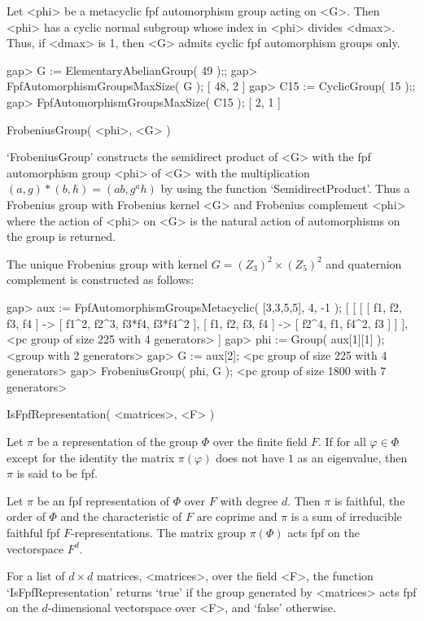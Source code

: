 Let <phi> be a metacyclic fpf automorphism group acting on <G>.
Then <phi> has a cyclic normal subgroup whose index in <phi> divides <dmax>.
Thus, if <dmax> is 1, then <G> admits cyclic fpf automorphism
groups only.

\beginexample
    gap> G := ElementaryAbelianGroup( 49 );;
    gap> FpfAutomorphismGroupsMaxSize( G );
    [ 48, 2 ]
    gap> C15 := CyclicGroup( 15 );;
    gap> FpfAutomorphismGroupsMaxSize( C15 );
    [ 2, 1 ]
\endexample

\>FrobeniusGroup( <phi>, <G> )

`FrobeniusGroup' constructs the semidirect product of <G> with the 
fpf automorphism group <phi> of <G> with the multiplication
$(a,g)*(b,h)=(ab,g^ah)$ by using the function `SemidirectProduct'.
Thus a Frobenius group with Frobenius kernel <G> and Frobenius complement
<phi> where the action of <phi> on <G> is the natural action of automorphisms
on the group is returned.

The unique Frobenius group with kernel
$G = (Z_{3})^2\times(Z_{5})^2$
and quaternion complement is constructed as follows:

\beginexample
    gap> aux := FpfAutomorphismGroupsMetacyclic( [3,3,5,5], 4, -1 ); 
    [ [ [ [ f1, f2, f3, f4 ] -> [ f1^2, f2^3, f3*f4, f3*f4^2 ], 
              [ f1, f2, f3, f4 ] -> [ f2^4, f1, f4^2, f3 ] ] ], 
      <pc group of size 225 with 4 generators> ]
    gap> phi := Group( aux[1][1] );
    <group with 2 generators>
    gap> G := aux[2];
    <pc group of size 225 with 4 generators>
    gap> FrobeniusGroup( phi, G );
    <pc group of size 1800 with 7 generators>
\endexample



\>IsFpfRepresentation( <matrices>, <F>  )

Let $\pi$ be a representation of the group $\Phi$ over the finite field $F$.
If for all $\varphi\in\Phi$ except for the identity the matrix $\pi(\varphi)$
does not have $1$ as an eigenvalue, then $\pi$ is said to be fpf.

Let $\pi$ be an fpf representation of $\Phi$ over $F$ with degree
$d$. Then $\pi$ is faithful, the order of $\Phi$ and the characteristic of
$F$ are coprime and $\pi$ is a sum of irreducible faithful fpf
$F$-representations.
The matrix group $\pi(\Phi)$ acts fpf on the vectorspace $F^d$.

For a list of $d\times d$ matrices, <matrices>, over the field <F>,
the function `IsFpfRepresentation' returns `true' if the  
group generated by <matrices> acts fpf on the $d$-dimensional
vectorspace over <F>, and `false' otherwise.

